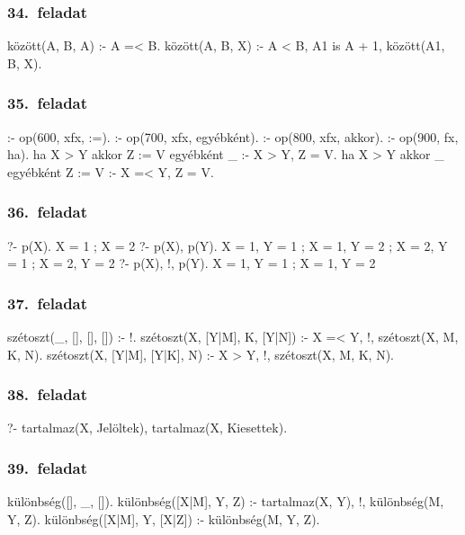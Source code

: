 \subsubsection*{34.~feladat}
\begin{program}
között(A, B, A) :- A =< B. 
között(A, B, X) :-
    A < B, A1 is A + 1,
    között(A1, B, X). 
\end{program}
\subsubsection*{35.~feladat}
\begin{program}
:- op(600, xfx, :=). 
:- op(700, xfx, egyébként). 
:- op(800, xfx, akkor). 
:- op(900, fx, ha). 
ha X > Y akkor Z := V egyébként _ :- X > Y, Z = V. 
ha X > Y akkor _ egyébként Z := V :- X =< Y, Z = V. 
\end{program}
\subsubsection*{36.~feladat}
\begin{query}
?- p(X).
X = 1 ;
X = 2
?- p(X), p(Y).
X = 1, Y = 1 ;
X = 1, Y = 2 ;
X = 2, Y = 1 ;
X = 2, Y = 2
?- p(X), !, p(Y).
X = 1, Y = 1 ;
X = 1, Y = 2
\end{query}
\subsubsection*{37.~feladat}
\begin{program}
szétoszt(_, [], [], []) :- !. 
szétoszt(X, [Y|M], K, [Y|N]) :-
    X =< Y, !, szétoszt(X, M, K, N). 
szétoszt(X, [Y|M], [Y|K], N) :-
    X > Y, !, szétoszt(X, M, K, N). 
\end{program}
\subsubsection*{38.~feladat}
\begin{query}
?- tartalmaz(X, Jelöltek),
   \+ tartalmaz(X, Kiesettek).
\end{query}
\subsubsection*{39.~feladat}
\begin{program}
különbség([], _, []). 
különbség([X|M], Y, Z) :-
    tartalmaz(X, Y), !, különbség(M, Y, Z). 
különbség([X|M], Y, [X|Z]) :- különbség(M, Y, Z).
\end{program}
